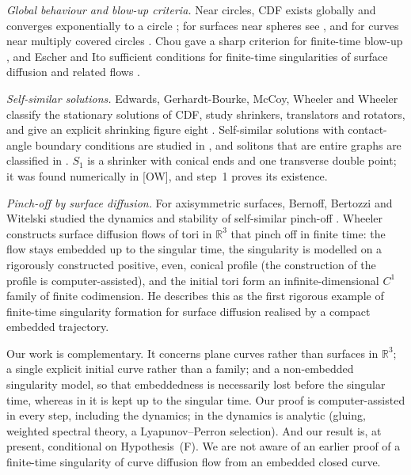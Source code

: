 \documentclass[11pt]{amsart}
\theoremstyle{definition}
\theoremstyle{remark}
\newcommand{\R}{\mathbb{R}}
\newcommand{\dref}[1]{[\textsf{#1}]}
\begin{document}
\emph{Global behaviour and blow-up criteria.} Near circles, CDF exists globally \cite{ElliottGarcke1997} and converges exponentially to a circle \cite{Wheeler2013}; for surfaces near spheres see \cite{EscherMayerSimonett1998,Wheeler2012}, and for curves near multiply covered circles \cite{MiuraOkabe2021}. Chou gave a sharp criterion for finite-time blow-up \cite{Chou2003}, and Escher and Ito sufficient conditions for finite-time singularities of surface diffusion and related flows \cite{EscherIto2005}.

\emph{Self-similar solutions.} Edwards, Gerhardt-Bourke, McCoy, Wheeler and Wheeler classify the stationary solutions of CDF, study shrinkers, translators and rotators, and give an explicit shrinking figure eight \cite{EGMWW2015}. Self-similar solutions with contact-angle boundary conditions are studied in \cite{AsaiGiga2014}, and solitons that are entire graphs are classified in \cite{RybkaWheeler2024}. $S_1$ is a shrinker with conical ends and one transverse double point; it was found numerically in \dref{OW}, and step~1 proves its existence.

\emph{Pinch-off by surface diffusion.} For axisymmetric surfaces, Bernoff, Bertozzi and Witelski studied the dynamics and stability of self-similar pinch-off \cite{BernoffBertozziWitelski1998}. Wheeler \cite{Wheeler2026} constructs surface diffusion flows of tori in $\R^3$ that pinch off in finite time: the flow stays embedded up to the singular time, the singularity is modelled on a rigorously constructed positive, even, conical profile (the construction of the profile is computer-assisted), and the initial tori form an infinite-dimensional $C^1$ family of finite codimension. He describes this as the first rigorous example of finite-time singularity formation for surface diffusion realised by a compact embedded trajectory.

Our work is complementary. It concerns plane curves rather than surfaces in $\R^3$; a single explicit initial curve rather than a family; and a non-embedded singularity model, so that embeddedness is necessarily lost before the singular time, whereas in \cite{Wheeler2026} it is kept up to the singular time. Our proof is computer-assisted in every step, including the dynamics; in \cite{Wheeler2026} the dynamics is analytic (gluing, weighted spectral theory, a Lyapunov--Perron selection). And our result is, at present, conditional on Hypothesis~(F). We are not aware of an earlier proof of a finite-time singularity of curve diffusion flow from an embedded closed curve.
\end{document}
